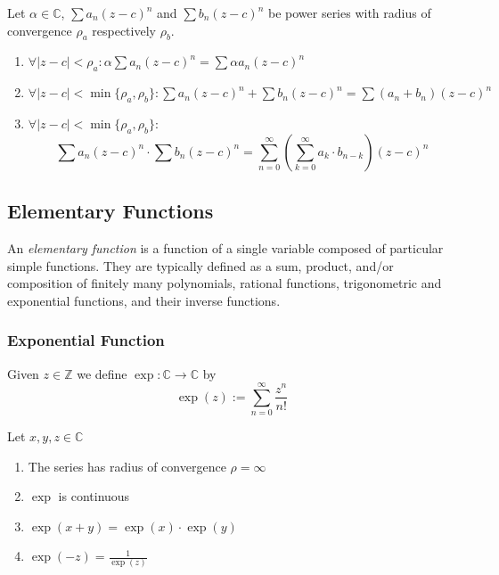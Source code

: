 \begin{theorem}
   Let \(\alpha \in \mathbb{C}\), \(\sum a_n (z - c)^n\) and \(\sum b_n (z-c)^n\) be power series with radius of convergence \(\rho_a\) respectively \(\rho_b\).
   \begin{enumerate}[label=\roman*, align=Center]
      \item \(\forall |z-c| < \rho_a: \alpha \sum a_n (z - c)^n = \sum \alpha a_n (z - c)^n\)
      \item \(\forall |z-c| < \min\{\rho_a, \rho_b\}: \sum a_n (z-c)^n + \sum b_n (z-c)^n = \sum (a_n + b_n)(z-c)^n\)
      \item \(\forall |z-c| < \min\{\rho_a, \rho_b\}:\)
            \[\sum a_n (z-c)^n \cdot \sum b_n (z-c)^n = \sum_{n=0}^\infty\left(\sum_{k=0}^\infty a_k \cdot b_{n-k}\right)(z-c)^n\]
   \end{enumerate}
\end{theorem}

\newpage

\subsection{Elementary Functions}
An \emph{elementary function} is a function of a single variable composed of particular simple functions.
They are typically defined as a sum, product, and/or composition of finitely many polynomials, rational functions, trigonometric and exponential functions, and their inverse functions.

\subsubsection{Exponential Function}
\begin{definition}
   Given \(z \in \mathbb{Z}\) we define \(\exp: \mathbb{C} \to \mathbb{C}\) by
   \[\exp(z) := \sum_{n = 0}^\infty \frac{z^n}{n!}\]
\end{definition}

\begin{proposition}[Properties]
   Let \(x, y, z \in \mathbb{C}\)
   \begin{enumerate}[label=\roman*, align=Center]
      \item The series has radius of convergence \(\rho = \infty\)
      \item \(\exp\) is continuous
      \item \(\exp(x + y) = \exp(x) \cdot \exp(y)\)
      \item \(\exp(-z) = \frac{1}{\exp(z)}\)
   \end{enumerate}
\end{proposition}

